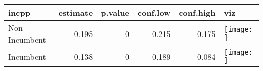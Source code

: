\begin{table}
\centering
\begin{tabular}[t]{lrrrr>{}l}
\toprule
incpp & estimate & p.value & conf.low & conf.high & viz\\
\midrule
Non-Incumbent & -0.195 & 0 & -0.215 & -0.175 & \texttt{[image: ]}\\
Incumbent & -0.138 & 0 & -0.189 & -0.084 & \texttt{[image: ]}\\
\bottomrule
\end{tabular}
\end{table}
